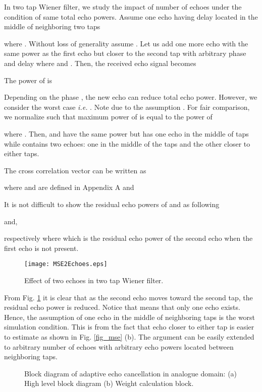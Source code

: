\documentclass[twocolumn]{IEEEtran}
\begin{document}
In two tap Wiener filter, we study the impact of number of echoes
under the condition of same total echo powers. Assume one echo
having delay  located in the middle of neighboring two taps


where . Without loss of generality assume
. Let us add one more echo with the same power as
the first echo but closer to the second tap with arbitrary phase
 and delay  where  and . Then, the received echo
signal becomes


The power of  is


Depending on the phase , the new echo can
reduce total echo power. However, we consider the worst case
\emph{i.e.} . Note
 due to the assumption . For fair
comparison, we normalize  such that maximum power of
 is equal to the power of 


where . Then,  and 
have the same power but  has one echo in the middle of taps
while  contains two echoes: one in the middle of the taps
and the other closer to either taps.

The cross correlation vector can be written as


where  and
 are defined in Appendix A and


It is not difficult to show the residual echo powers of  and
 as following


and,

respectively where 
which is the residual echo power of the second echo when the first
echo is not present.

\begin{figure}[!t]

\centering
    {\texttt{[image: MSE2Echoes.eps]}}


\caption{Effect of two echoes in two tap Wiener filter.
\label{fig_mse2echoes} }

\end{figure}


From Fig. \ref{fig_mse2echoes} it is clear that as the second echo
moves toward the second tap, the residual echo power is reduced.
Notice that  means that only one echo exists. Hence, the
assumption of one echo in the middle of neighboring taps is the
worst simulation condition. This is from the fact that echo closer
to either tap is easier to estimate as shown in Fig. \ref{fig_mse}
(b). The argument can be easily extended to arbitrary number of
echoes with arbitrary echo powers located between neighboring taps.


\begin{figure}[!ht]

\centering {}

\caption{Block diagram of adaptive echo cancellation in analogue
domain: (a) High level block diagram (b) Weight calculation block.
\label{fig_blk} }

\end{figure}
\end{document}
